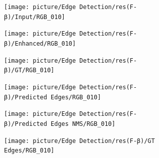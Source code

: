 \documentclass[a4paper]{ctexart}
\begin{document}
\begin{figure}[htbp]
			\begin{subfigure}{0.16\textwidth}
				\texttt{[image: picture/Edge Detection/res(F-β)/Input/RGB\_010]}
				\captionsetup{font=scriptsize}
				\label{fig: RGB_010}
			\end{subfigure}
			\begin{subfigure}{0.16\textwidth}
				\texttt{[image: picture/Edge Detection/res(F-β)/Enhanced/RGB\_010]}
				\captionsetup{font=scriptsize}
				\label{fig: RGB_010 Enhanced}
			\end{subfigure}
			\begin{subfigure}{0.16\textwidth}
				\texttt{[image: picture/Edge Detection/res(F-β)/GT/RGB\_010]}
				\captionsetup{font=scriptsize}
				\label{fig: RGB_010 GT}
			\end{subfigure}
			\begin{subfigure}{0.16\textwidth}
				\texttt{[image: picture/Edge Detection/res(F-β)/Predicted Edges/RGB\_010]}
				\captionsetup{font=scriptsize}
				\label{fig: RGB_010 Pred}
			\end{subfigure}
			\begin{subfigure}{0.16\textwidth}
				\texttt{[image: picture/Edge Detection/res(F-β)/Predicted Edges NMS/RGB\_010]}
				\captionsetup{font=scriptsize}
				\label{fig: RGB_010 Pred NMS}
			\end{subfigure}
			\begin{subfigure}{0.16\textwidth}
				\texttt{[image: picture/Edge Detection/res(F-β)/GT Edges/RGB\_010]}
				\captionsetup{font=scriptsize}
				\label{fig: RGB_010 GT Edges}
			\end{subfigure} \\
			
			\vspace{-10pt}
			

\end{figure}
\end{document}
